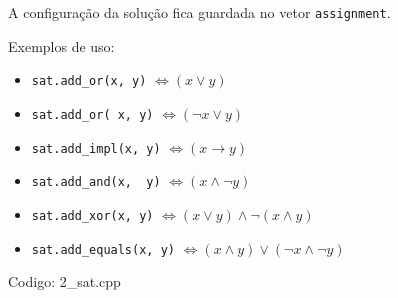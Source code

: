 \documentclass[10pt, a4paper, oneside]{book}
\begin{document}
A configuração da solução fica guardada no vetor \texttt{assignment}.



Exemplos de uso:



\begin{itemize}
\item \texttt{sat.add\_or(x, y)} $\Leftrightarrow (x \lor y)$
\item \texttt{sat.add\_or(~x, y)} $\Leftrightarrow (\lnot x \lor y)$
\item \texttt{sat.add\_impl(x, y)} $\Leftrightarrow (x \rightarrow y)$
\item \texttt{sat.add\_and(x, ~y)} $\Leftrightarrow (x \land \lnot y)$
\item \texttt{sat.add\_xor(x, y)} $\Leftrightarrow (x \lor y) \land \lnot (x \land y)$
\item \texttt{sat.add\_equals(x, y)} $\Leftrightarrow (x \land y) \lor (\lnot x \land \lnot y)$
\end{itemize}

\hfill

Codigo: 2\_sat.cpp
\end{document}

